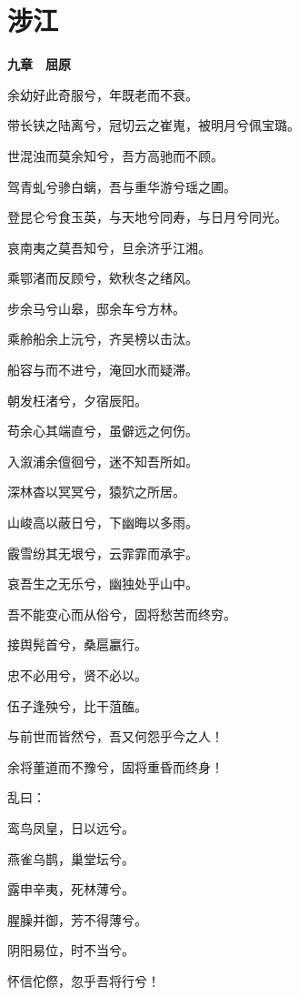 \documentclass[12pt,a4paper]{ctexbook}
\begin{document}
\section{涉江}
\textbf{九章　屈原}\par\vspace{0.5em}
余幼好此奇服兮，年既老而不衰。\par
带长铗之陆离兮，冠切云之崔嵬，被明月兮佩宝璐。\par
世混浊而莫余知兮，吾方高驰而不顾。\par
驾青虬兮骖白螭，吾与重华游兮瑶之圃。\par
登昆仑兮食玉英，与天地兮同寿，与日月兮同光。\par
哀南夷之莫吾知兮，旦余济乎江湘。\par
乘鄂渚而反顾兮，欸秋冬之绪风。\par
步余马兮山皋，邸余车兮方林。\par
乘舲船余上沅兮，齐吴榜以击汰。\par
船容与而不进兮，淹回水而疑滞。\par
朝发枉渚兮，夕宿辰阳。\par
苟余心其端直兮，虽僻远之何伤。\par
入溆浦余儃徊兮，迷不知吾所如。\par
深林杳以冥冥兮，猿狖之所居。\par
山峻高以蔽日兮，下幽晦以多雨。\par
霰雪纷其无垠兮，云霏霏而承宇。\par
哀吾生之无乐兮，幽独处乎山中。\par
吾不能变心而从俗兮，固将愁苦而终穷。\par
接舆髡首兮，桑扈臝行。\par
忠不必用兮，贤不必以。\par
伍子逢殃兮，比干菹醢。\par
与前世而皆然兮，吾又何怨乎今之人！\par
余将董道而不豫兮，固将重昏而终身！\par
乱曰：\par
鸾鸟凤皇，日以远兮。\par
燕雀乌鹊，巢堂坛兮。\par
露申辛夷，死林薄兮。\par
腥臊并御，芳不得薄兮。\par
阴阳易位，时不当兮。\par
怀信佗傺，忽乎吾将行兮！\par
\end{document}
